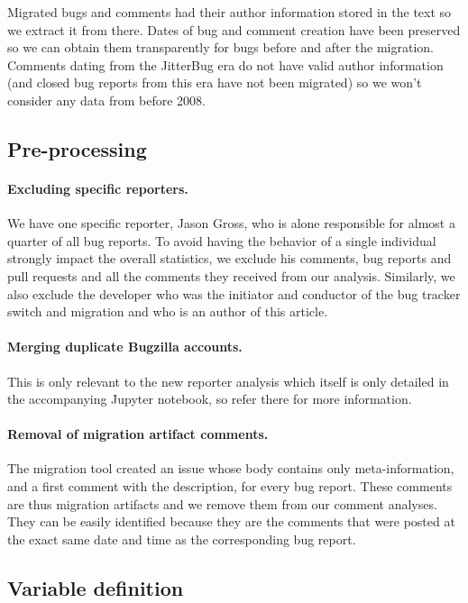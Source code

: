 \documentclass[runningheads]{llncs}
\begin{document}
Migrated bugs and comments had their author information stored in the text so we extract it from there. Dates of bug and comment creation have been preserved so we can obtain them transparently for bugs before and after the migration. Comments dating from the JitterBug era do not have valid author information (and closed bug reports from this era have not been migrated) so we won't consider any data from before 2008.

\subsection{Pre-processing}

\paragraph{Excluding specific reporters.}
We have one specific reporter, Jason Gross, who is alone responsible for almost a quarter of all bug reports. To avoid having the behavior of a single individual strongly impact the overall statistics, we exclude his comments, bug reports and pull requests and all the comments they received from our analysis. Similarly, we also exclude the developer who was the initiator and conductor of the bug tracker switch and migration and who is an author of this article.

\paragraph{Merging duplicate Bugzilla accounts.}
This is only relevant to the new reporter analysis which itself is only detailed in the accompanying Jupyter notebook, so refer there for more information.

\paragraph{Removal of migration artifact comments.}
The migration tool created an issue whose body contains only meta-information, and a first comment with the description, for every bug report. These comments are thus migration artifacts and we remove them from our comment analyses. They can be easily identified because they are the comments that were posted at the exact same date and time as the corresponding bug report.

\subsection{Variable definition}
\end{document}

